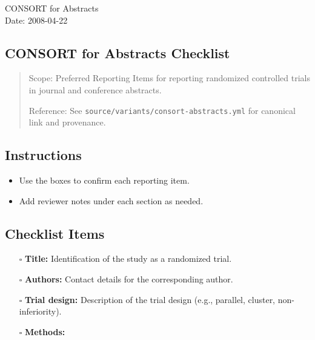 \documentclass[11pt]{article}
\def\tightlist{}
\begin{document}
\begin{center}
{\LARGE CONSORT for Abstracts}\\[4pt]
\normalsize Date: 2008-04-22
\end{center}
\vspace{1em}

\begin{Form}

\section{CONSORT for Abstracts
Checklist}\label{consort-for-abstracts-checklist}

\begin{quote}
Scope: Preferred Reporting Items for reporting randomized controlled
trials in journal and conference abstracts.

Reference: See \texttt{source/variants/consort-abstracts.yml} for
canonical link and provenance.
\end{quote}

\subsection{Instructions}\label{instructions}

\begin{itemize}
\tightlist
\item
  Use the boxes to confirm each reporting item.
\item
  Add reviewer notes under each section as needed.
\end{itemize}

\subsection{Checklist Items}\label{checklist-items}

\begin{itemize}
\tightlist
\item[$\square$]
  \textbf{Title:} Identification of the study as a randomized trial.
\item[$\square$]
  \textbf{Authors:} Contact details for the corresponding author.
\item[$\square$]
  \textbf{Trial design:} Description of the trial design (e.g.,
  parallel, cluster, non-inferiority).
\item[$\square$]
  \textbf{Methods:}


\end{itemize}
\end{Form}
\end{document}
